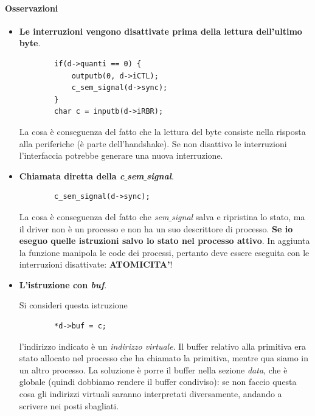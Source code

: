 \paragraph{Osservazioni} 
\begin{itemize}
	\item \textbf{Le interruzioni vengono disattivate prima della lettura dell'ultimo byte}.
	\small
	\begin{verbatim}
		if(d->quanti == 0) {
			outputb(0, d->iCTL);
			c_sem_signal(d->sync);    
		}
		char c = inputb(d->iRBR);
	\end{verbatim}
	\normalsize
	La cosa è conseguenza del fatto che la lettura del byte consiste nella risposta alla periferiche (è parte dell'handshake). Se non disattivo le interruzioni l'interfaccia potrebbe generare una nuova interruzione.
	
	\item \textbf{Chiamata diretta della \emph{c$\_$sem$\_$signal}}.
	\small
	\begin{verbatim}
		c_sem_signal(d->sync);    
	\end{verbatim}
	\normalsize
	La cosa è conseguenza del fatto che \emph{sem$\_$signal} salva e ripristina lo stato, ma il driver non è un processo e non ha un suo descrittore di processo. \textbf{Se io eseguo quelle istruzioni salvo lo stato nel processo attivo}. In aggiunta la funzione manipola le code dei processi, pertanto deve essere eseguita con le interruzioni disattivate: \textbf{ATOMICITA'}!
	
	\item \textbf{L'istruzione con \emph{buf}}.
	
	Si consideri questa istruzione
	\begin{verbatim}
		*d->buf = c;
	\end{verbatim}
	l'indirizzo indicato è un \emph{indirizzo virtuale}. Il buffer relativo alla primitiva era stato allocato nel processo che ha chiamato la primitiva, mentre qua siamo in un altro processo. La soluzione è porre il buffer nella sezione \emph{data}, che è globale (quindi dobbiamo rendere il buffer condiviso): se non faccio questa cosa gli indirizzi virtuali saranno interpretati diversamente, andando a scrivere nei posti sbagliati. 
\end{itemize}	
